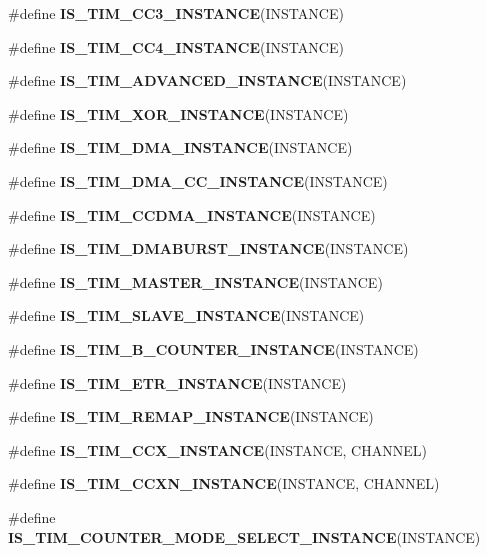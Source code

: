 \begin{DoxyCompactItemize}
\#define {\bfseries I\+S\+\_\+\+T\+I\+M\+\_\+\+C\+C3\+\_\+\+I\+N\+S\+T\+A\+N\+CE}(I\+N\+S\+T\+A\+N\+CE)
\item 
\#define {\bfseries I\+S\+\_\+\+T\+I\+M\+\_\+\+C\+C4\+\_\+\+I\+N\+S\+T\+A\+N\+CE}(I\+N\+S\+T\+A\+N\+CE)
\item 
\#define {\bfseries I\+S\+\_\+\+T\+I\+M\+\_\+\+A\+D\+V\+A\+N\+C\+E\+D\+\_\+\+I\+N\+S\+T\+A\+N\+CE}(I\+N\+S\+T\+A\+N\+CE)
\item 
\#define {\bfseries I\+S\+\_\+\+T\+I\+M\+\_\+\+X\+O\+R\+\_\+\+I\+N\+S\+T\+A\+N\+CE}(I\+N\+S\+T\+A\+N\+CE)
\item 
\#define {\bfseries I\+S\+\_\+\+T\+I\+M\+\_\+\+D\+M\+A\+\_\+\+I\+N\+S\+T\+A\+N\+CE}(I\+N\+S\+T\+A\+N\+CE)
\item 
\#define {\bfseries I\+S\+\_\+\+T\+I\+M\+\_\+\+D\+M\+A\+\_\+\+C\+C\+\_\+\+I\+N\+S\+T\+A\+N\+CE}(I\+N\+S\+T\+A\+N\+CE)
\item 
\#define {\bfseries I\+S\+\_\+\+T\+I\+M\+\_\+\+C\+C\+D\+M\+A\+\_\+\+I\+N\+S\+T\+A\+N\+CE}(I\+N\+S\+T\+A\+N\+CE)
\item 
\#define {\bfseries I\+S\+\_\+\+T\+I\+M\+\_\+\+D\+M\+A\+B\+U\+R\+S\+T\+\_\+\+I\+N\+S\+T\+A\+N\+CE}(I\+N\+S\+T\+A\+N\+CE)
\item 
\#define {\bfseries I\+S\+\_\+\+T\+I\+M\+\_\+\+M\+A\+S\+T\+E\+R\+\_\+\+I\+N\+S\+T\+A\+N\+CE}(I\+N\+S\+T\+A\+N\+CE)
\item 
\#define {\bfseries I\+S\+\_\+\+T\+I\+M\+\_\+\+S\+L\+A\+V\+E\+\_\+\+I\+N\+S\+T\+A\+N\+CE}(I\+N\+S\+T\+A\+N\+CE)
\item 
\#define {\bfseries I\+S\+\_\+\+T\+I\+M\+\_\+B\+\_\+\+C\+O\+U\+N\+T\+E\+R\+\_\+\+I\+N\+S\+T\+A\+N\+CE}(I\+N\+S\+T\+A\+N\+CE)
\item 
\#define {\bfseries I\+S\+\_\+\+T\+I\+M\+\_\+\+E\+T\+R\+\_\+\+I\+N\+S\+T\+A\+N\+CE}(I\+N\+S\+T\+A\+N\+CE)
\item 
\#define {\bfseries I\+S\+\_\+\+T\+I\+M\+\_\+\+R\+E\+M\+A\+P\+\_\+\+I\+N\+S\+T\+A\+N\+CE}(I\+N\+S\+T\+A\+N\+CE)
\item 
\mbox{\label{group___exported__macros_ga6517a51ea79512a42bc53c718a77f18e}} 
\#define {\bfseries I\+S\+\_\+\+T\+I\+M\+\_\+\+C\+C\+X\+\_\+\+I\+N\+S\+T\+A\+N\+CE}(I\+N\+S\+T\+A\+N\+CE,  C\+H\+A\+N\+N\+EL)
\item 
\#define {\bfseries I\+S\+\_\+\+T\+I\+M\+\_\+\+C\+C\+X\+N\+\_\+\+I\+N\+S\+T\+A\+N\+CE}(I\+N\+S\+T\+A\+N\+CE,  C\+H\+A\+N\+N\+EL)
\item 
\#define {\bfseries I\+S\+\_\+\+T\+I\+M\+\_\+\+C\+O\+U\+N\+T\+E\+R\+\_\+\+M\+O\+D\+E\+\_\+\+S\+E\+L\+E\+C\+T\+\_\+\+I\+N\+S\+T\+A\+N\+CE}(I\+N\+S\+T\+A\+N\+CE)

\end{DoxyCompactItemize}
